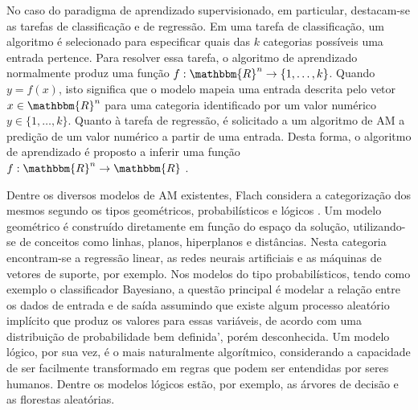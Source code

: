 No caso do paradigma de aprendizado supervisionado, em particular, destacam-se as tarefas de classificação e de regressão. Em uma tarefa de classificação, um algoritmo é selecionado para especificar quais das $k$ categorias possíveis uma entrada pertence. Para resolver essa tarefa, o algoritmo de aprendizado normalmente produz uma função $f : \mathbbm{R}^n \rightarrow \{1, \ldots, k\}$. Quando $y = f(x)$, isto significa que o modelo mapeia uma entrada descrita pelo vetor $x \in \mathbbm{R}^n$ para uma categoria identificado por um valor numérico $y \in \{1, \ldots, k\} $. Quanto à tarefa de regressão, é solicitado a um algoritmo de AM a predição de um valor numérico a partir de uma entrada. Desta forma, o algoritmo de aprendizado é proposto a inferir uma função $f : \mathbbm{R}^n \rightarrow \mathbbm{R}$ \cite{goodfellow}.


Dentre os diversos modelos de AM existentes, Flach considera a categorização dos mesmos segundo os tipos geométricos, probabilísticos e lógicos \cite{flach}. Um modelo geométrico é construído diretamente em função do espaço da solução, utilizando-se de conceitos como linhas, planos, hiperplanos e distâncias. Nesta categoria encontram-se a regressão linear, as redes neurais artificiais e as máquinas de vetores de suporte, por exemplo. Nos modelos do tipo probabilísticos, tendo como exemplo o classificador Bayesiano, a questão principal é modelar a relação entre os dados de entrada e de saída assumindo que existe algum processo aleatório implícito que produz os valores para essas variáveis, de acordo com uma distribuição de probabilidade bem definida', porém desconhecida. Um modelo lógico, por sua vez, é o mais naturalmente algorítmico, considerando a capacidade de ser facilmente transformado em regras que podem ser entendidas por seres humanos. Dentre os modelos lógicos estão, por exemplo, as árvores de decisão e as florestas aleatórias.




